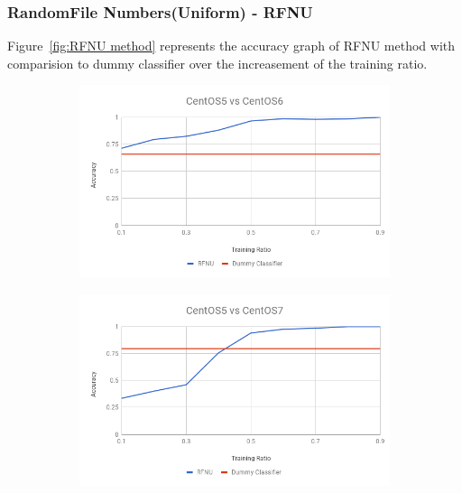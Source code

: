 \documentclass[10pt, conference, compsocconf]{IEEEtran}
\begin{document}
\subsubsection{RandomFile Numbers(Uniform) - RFNU}
Figure~\ref{fig:RFNU method} represents
the accuracy graph of RFNU method with comparision to dummy
classifier over the increasement of the training ratio.
\begin{figure}[h!]
        \centering
        \begin{subfigure}[b]{0.8\linewidth}
                \includegraphics[width=\columnwidth]{figures/ALS/RFNU-ALS-5vs6-PFS}
        \end{subfigure}
        \begin{subfigure}[b]{0.8\linewidth}
                \includegraphics[width=\columnwidth]{figures/ALS/RFNU-ALS-5vs7-PFS}
        \end{subfigure}
        \begin{subfigure}[b]{0.8\linewidth}

\end{subfigure}
\end{figure}
\end{document}
